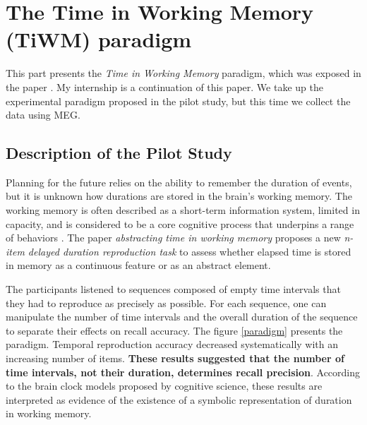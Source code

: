 \section{The Time in Working Memory (TiWM) paradigm}

This part presents the \textit{Time in Working Memory} paradigm, which was exposed in the paper \cite{herbst2021abstracting}. My internship is a continuation of this paper. We take up the experimental paradigm proposed in the pilot study, but this time we collect the data using MEG.

\subsection{Description of the Pilot Study}

Planning for the future relies on the ability to remember the duration of events, but it is unknown how durations are stored in the brain's working memory. The working memory is often described as a short-term information system, limited in capacity, and is considered to be a core cognitive process that underpins a range of behaviors \cite{ma2014changing}. The paper \textit{abstracting time in working memory} proposes a new \textit{n-item delayed duration reproduction task} to assess whether elapsed time is stored in memory as a continuous feature or as an abstract element.


The participants listened to sequences composed of empty time intervals that they had to reproduce as precisely as possible. For each sequence, one can manipulate the number of time intervals and the overall duration of the sequence to separate their effects on recall accuracy. The figure \ref{paradigm} presents the paradigm. Temporal reproduction accuracy decreased systematically with an increasing number of items. \textbf{These results suggested that the number of time intervals, not their duration, determines recall precision}. According to the brain clock models proposed by cognitive science, these results are interpreted as evidence of the existence of a symbolic representation of duration in working memory.


